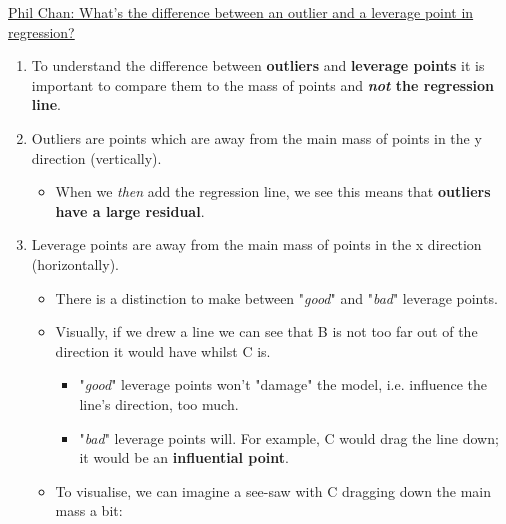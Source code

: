 \documentclass[12pt, titlepage, french]{report}
\begin{document}
\begin{YTB_SUMM}{\href{https://www.youtube.com/watch?v=s5X_Poq9dJA}{Phil Chan: What's the difference between an outlier and a leverage point in regression?}}
\begin{tikzpicture}[x=0.75pt,y=0.75pt,yscale=-1,xscale=1]
\end{tikzpicture}
\begin{enumerate}
	\item	To understand the difference between \textbf{outliers} and \textbf{leverage points} it is important to compare them to the mass of points and \textbf{\textit{not} the regression line}.
	\item	Outliers are points which are away from the main mass of points in the y direction (vertically).
	\begin{itemize}
		\item	When we \textit{then} add the regression line, we see this means that \textbf{outliers have a large residual}.
	\end{itemize}
	\item	Leverage points are away from the main mass of points in the x direction (horizontally).
	\begin{itemize}
		\item	There is a distinction to make between "\textit{good}" and "\textit{bad}" leverage points.
		\item	Visually, if we drew a line we can see that B is not too far out of the direction it would have whilst C is.
		\begin{itemize}
			\item	"\textit{good}" leverage points won't "damage" the model, i.e. influence the line's direction, too much.
			\item	"\textit{bad}" leverage points will. For example, C would drag the line down; it would be an \textbf{influential point}.
		\end{itemize}
		\item	To visualise, we can imagine a see-saw with C dragging down the main mass a bit:
	\end{itemize}


\end{enumerate}
\end{YTB_SUMM}
\end{document}
